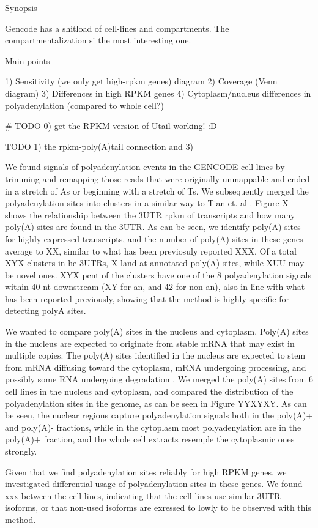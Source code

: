 \documentclass[a4paper]{article}
\begin{document}
 
Synopsis

Gencode has a shitload of cell-lines and compartments. The compartmentalization
si the most interesting one.

Main points

1) Sensitivity (we only get high-rpkm genes) diagram
2) Coverage (Venn diagram)
3) Differences in high RPKM genes
4) Cytoplasm/nucleus differences in polyadenylation (compared to whole cell?)

# TODO 0) get the RPKM version of Utail working! :D

TODO 1) the rpkm-poly(A)tail connection
and 3) %

We found signals of polyadenylation events in the GENCODE cell lines by
trimming and remapping those reads that were originally unmappable and ended in
a stretch of As or beginning with a stretch of Ts. We subsequently merged the
polyadenylation sites into clusters in a similar way to Tian et. al
\cite{tian_large-scale_2005}. Figure X shows the relationship between the 3UTR
rpkm of transcripts and how many poly(A) sites are found in the 3UTR. As can be
seen, we identify poly(A) sites for highly expressed transcripts, and the
number of poly(A) sites in these genes average to XX, similar to what has been
previosuly reported XXX. Of a total XYX clusters in he 3UTRs, X land at annotated
poly(A) sites, while XUU may be novel ones. XYX pcnt of the clusters have one of the
8 polyadenylation signals within 40 nt downstream (XY for an, and 42 for
non-an), also in line with what has been reported previously, showing that the method is highly specific for detecting polyA sites.

We wanted to compare poly(A) sites in the nucleus and cytoplasm. Poly(A) sites
in the nucleus are expected to originate from stable mRNA that may exist in
multiple copies. The poly(A) sites identified in the nucleus are expected to
stem from mRNA diffusing toward the cytoplasm, mRNA undergoing
processing, and possibly some RNA undergoing degradation
\cite{shcherbik_polyadenylation_2010,slomovic_addition_2010}. We merged the
poly(A) sites from 6 cell lines in the nucleus and cytoplasm, and compared the
distribution of the polyadenylation sites in the genome, as can be seen in
Figure YYXYXY. As can be seen, the nuclear regions capture polyadenylation
signals both in the poly(A)+ and poly(A)- fractions, while in the cytoplasm
most polyadenylation are in the poly(A)+ fraction, and the whole cell extracts
resemple the cytoplasmic ones strongly.

Given that we find polyadenylation sites reliably for high RPKM genes, we
investigated differential usage of polyadenylation sites in these genes. We
found xxx between the cell lines, indicating that the cell lines use similar
3UTR isoforms, or that non-used isoforms are exressed to lowly to be observed
with this method.



\end{document}
